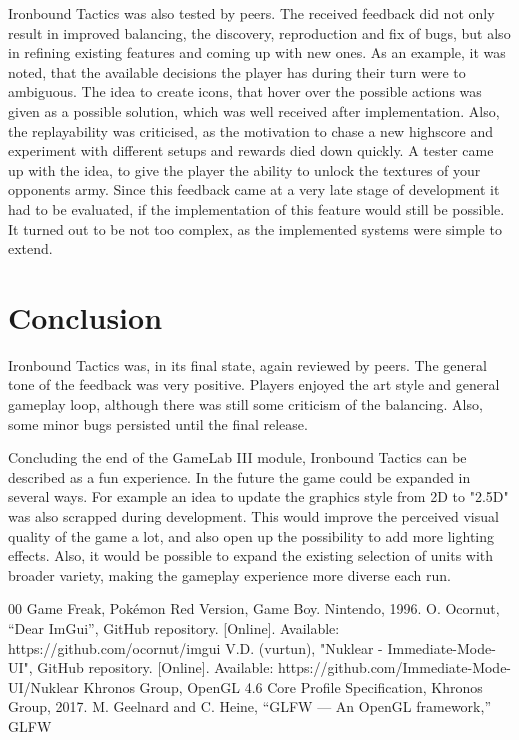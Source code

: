 \documentclass[conference]{IEEEtran}
\begin{document}
Ironbound Tactics was also tested by peers.
The received feedback did not only result in improved balancing, the discovery, reproduction and fix of bugs, but also in refining existing
features and coming up with new ones.
As an example, it was noted, that the available decisions the player has during their turn were to ambiguous.
The idea to create icons, that hover over the possible actions was given as a possible solution, which was well received
after implementation.
Also, the replayability was criticised, as the motivation to chase a new highscore and experiment with different setups
and rewards died down quickly.
A tester came up with the idea, to give the player the ability to unlock the textures of your opponents army.
Since this feedback came at a very late stage of development it had to be evaluated, if the implementation of this
feature would still be possible.
It turned out to be not too complex, as the implemented systems were simple to extend.

\section{Conclusion}
Ironbound Tactics was, in its final state, again reviewed by peers.
The general tone of the feedback was very positive.
Players enjoyed the art style and general gameplay loop, although there was still some criticism of the balancing.
Also, some minor bugs persisted until the final release.

Concluding the end of the GameLab III module, Ironbound Tactics can be described as a fun experience.
In the future the game could be expanded in several ways.
For example an idea to update the graphics style from 2D to "2.5D" was also scrapped during development.
This would improve the perceived visual quality of the game a lot, and also open up the possibility to add more lighting
effects.
Also, it would be possible to expand the existing selection of units with broader variety, making the
gameplay experience more diverse each run.

\begin{thebibliography}{00}
 Game Freak, Pokémon Red Version, Game Boy. Nintendo, 1996.
 O. Ocornut, “Dear ImGui”, GitHub repository. [Online]. Available: https://github.com/ocornut/imgui
 V.D. (vurtun), "Nuklear - Immediate-Mode-UI", GitHub repository. [Online]. Available: https://github.com/Immediate-Mode-UI/Nuklear
 Khronos Group, OpenGL 4.6 Core Profile Specification, Khronos Group, 2017.
 M. Geelnard and C. Heine, “GLFW — An OpenGL framework,” GLFW
\end{thebibliography}
\vspace{12pt}
\end{document}
